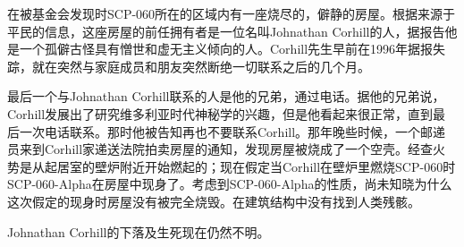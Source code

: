 在被基金会发现时SCP-060所在的区域内有一座烧尽的，僻静的房屋。根据来源于平民的信息，这座房屋的前任拥有者是一位名叫Johnathan Corhill的人，据报告他是一个孤僻古怪具有憎世和虚无主义倾向的人。Corhill先生早前在1996年据报失踪，就在突然与家庭成员和朋友突然断绝一切联系之后的几个月。

最后一个与Johnathan Corhill联系的人是他的兄弟，通过电话。据他的兄弟说，Corhill发展出了研究维多利亚时代神秘学的兴趣，但是他看起来很正常，直到最后一次电话联系。那时他被告知再也不要联系Corhill。那年晚些时候，一个邮递员来到Corhill家递送法院拍卖房屋的通知，发现房屋被烧成了一个空壳。经查火势是从起居室的壁炉附近开始燃起的；现在假定当Corhill在壁炉里燃烧SCP-060时SCP-060-Alpha在房屋中现身了。考虑到SCP-060-Alpha的性质，尚未知晓为什么这次假定的现身时房屋没有被完全烧毁。在建筑结构中没有找到人类残骸。

Johnathan Corhill的下落及生死现在仍然不明。
